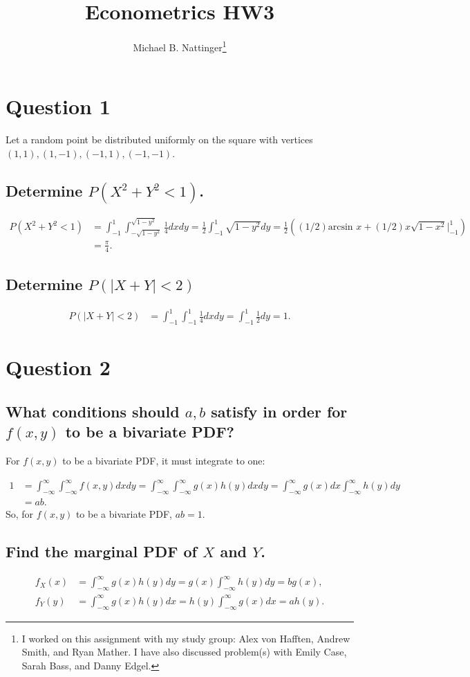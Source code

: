 \documentclass[11pt]{article} %
\title{Econometrics HW3}
\author{Michael B. Nattinger\footnote{I worked on this assignment with my study group: Alex von Hafften, Andrew Smith, and Ryan Mather. I have also discussed problem(s) with Emily Case, Sarah Bass, and Danny Edgel.}}
\begin{document}
\maketitle

\section{Question 1}
Let a random point be distributed uniformly on the square with vertices $(1,1),(1,-1),(-1,1),(-1,-1)$.
\subsection{Determine $P(X^2+Y^2<1)$.}
\begin{align*}
P(X^2+Y^2<1) &= \int_{-1}^{1}\int_{-\sqrt{1-y^2}}^{\sqrt{1-y^2}}\frac{1}{4}dxdy = \frac{1}{2}\int_{-1}^{1} \sqrt{1 - y^2 }dy = \frac{1}{2}((1/2)\text{arcsin }x  + (1/2)x\sqrt{1 - x^2}|_{-1}^{1}) \\
&= \frac{\pi}{4}.
\end{align*}
\subsection{Determine $P(|X+Y|<2)$}
\begin{align*}
P(|X+Y|<2) &= \int_{-1}^{1}\int_{-1}^{1}\frac{1}{4}dxdy = \int_{-1}^{1}\frac{1}{2}dy =  1.
\end{align*}
\section{Question 2}
\subsection{What conditions should $a,b$ satisfy in order for $f(x,y)$ to be a bivariate PDF?}
For $f(x,y)$ to be a bivariate PDF, it must integrate to one:

\begin{align*}
1 &= \int_{-\infty}^{\infty} \int_{-\infty}^{\infty} f(x,y) dxdy = \int_{-\infty}^{\infty}\int_{-\infty}^{\infty}g(x)h(y)dxdy = \int_{-\infty}^{\infty}g(x)dx\int_{-\infty}^{\infty}h(y)dy \\ &= ab.
\end{align*}
So, for $f(x,y)$ to be a bivariate PDF, $ab =1.$
\subsection{Find the marginal PDF of $X$ and $Y$.}
\begin{align*}
f_X(x) &= \int_{-\infty}^{\infty}g(x)h(y) dy = g(x)\int_{-\infty}^{\infty}h(y) dy = b g(x),\\
f_Y(y) &= \int_{-\infty}^{\infty}g(x)h(y) dx = h(y)\int_{-\infty}^{\infty}g(x) dx = a h(y).
\end{align*}
\end{document}
